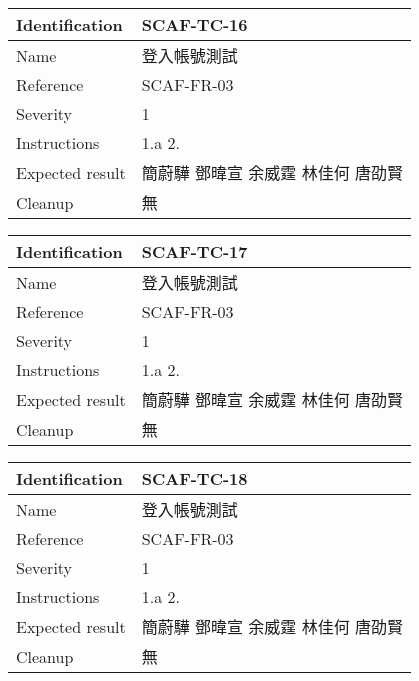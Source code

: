 \documentclass{report}
\begin{document}
\begin{tabularx}{0.9\textwidth}{
  |p{}%
  |p{}|%
  }
  \hline
  \centering Identification &  SCAF-TC-16 \\
  \hline
  \centering Name & 登入帳號測試 \\
  \hline
  \centering Reference & SCAF-FR-03 \\
  \hline
  \centering Severity & 1 \\
  \hline
  \centering Instructions & 1.a
                            2. \\
  \hline
  \centering Expected result & 簡蔚驊 \! 鄧暐宣 \! 余威霆 \! 林佳何 \! 唐劭賢 \\
  \hline
  \centering Cleanup & 無 \\
  \hline
\end{tabularx}
\newline\newline

\begin{tabularx}{0.9\textwidth}{
  |p{}%
  |p{}|%
  }
  \hline
  \centering Identification &  SCAF-TC-17 \\
  \hline
  \centering Name & 登入帳號測試 \\
  \hline
  \centering Reference & SCAF-FR-03 \\
  \hline
  \centering Severity & 1 \\
  \hline
  \centering Instructions & 1.a
                            2. \\
  \hline
  \centering Expected result & 簡蔚驊 \! 鄧暐宣 \! 余威霆 \! 林佳何 \! 唐劭賢 \\
  \hline
  \centering Cleanup & 無 \\
  \hline
\end{tabularx}
\newline\newline

\begin{tabularx}{0.9\textwidth}{
  |p{}%
  |p{}|%
  }
  \hline
  \centering Identification &  SCAF-TC-18 \\
  \hline
  \centering Name & 登入帳號測試 \\
  \hline
  \centering Reference & SCAF-FR-03 \\
  \hline
  \centering Severity & 1 \\
  \hline
  \centering Instructions & 1.a
                            2. \\
  \hline
  \centering Expected result & 簡蔚驊 \! 鄧暐宣 \! 余威霆 \! 林佳何 \! 唐劭賢 \\
  \hline
  \centering Cleanup & 無 \\
  \hline
\end{tabularx}
\newline\newline
\end{document}
